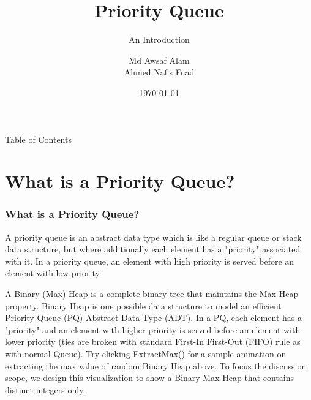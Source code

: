 \documentclass{beamer}
\title[About Beamer]{Priority Queue}
\subtitle{An Introduction}
\author[A.A. and A.N.F]{Md Awsaf Alam \inst{1} \\ Ahmed Nafis Fuad\inst{2}}
\institute{
\inst{1}
Department of CSE\\
BUET\\
\inst{2}
Department of CSE\\
BUET
}
\date{\today}
\begin{document}
\titlepage

\begin{frame}{Table of Contents}
\tableofcontents

\end{frame}
\section{What is a Priority Queue?}

\begin{frame}
\frametitle{What is a Priority Queue?}

A priority queue is an abstract data type which is like a regular queue or stack data structure,
but where additionally each element has a "priority" associated with it.
 In a priority queue, an element with high priority is served before an element with low priority.

A Binary (Max) Heap is a complete binary tree that maintains the Max Heap property.
Binary Heap is one possible data structure to model an efficient Priority Queue (PQ) Abstract Data Type (ADT). In a PQ, each element has a "priority" and an element with higher priority is served before an element with lower priority (ties are broken with standard First-In First-Out (FIFO) rule as with normal Queue). Try clicking ExtractMax() for a sample animation on extracting the max value of random Binary Heap above.
To focus the discussion scope, we design this visualization to show a Binary Max Heap that contains distinct integers only.

\end{frame}
\end{document}
